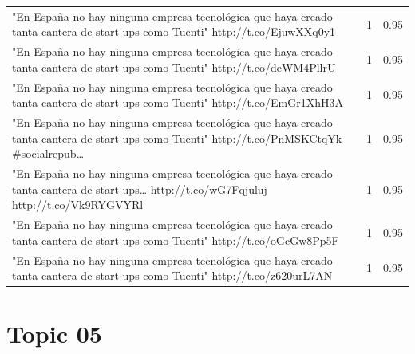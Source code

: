 \begin{longtable}{p{12.5cm}rr}
"En España no hay ninguna empresa tecnológica que haya creado tanta cantera de start-ups como Tuenti" http://t.co/EjuwXXq0y1 & 1 & 0.95 \\
"En España no hay ninguna empresa tecnológica que haya creado tanta cantera de start-ups como Tuenti" http://t.co/deWM4PllrU & 1 & 0.95 \\
"En España no hay ninguna empresa tecnológica que haya creado tanta cantera de start-ups como Tuenti" http://t.co/EmGr1XhH3A & 1 & 0.95 \\
"En España no hay ninguna empresa tecnológica que haya creado tanta cantera de start-ups como Tuenti" http://t.co/PnMSKCtqYk \#socialrepub… & 1 & 0.95 \\
"En España no hay ninguna empresa tecnológica que haya creado tanta cantera de start-ups… http://t.co/wG7Fqjuluj http://t.co/Vk9RYGVYRl & 1 & 0.95 \\
"En España no hay ninguna empresa tecnológica que haya creado tanta cantera de start-ups como Tuenti" http://t.co/oGcGw8Pp5F & 1 & 0.95 \\
"En España no hay ninguna empresa tecnológica que haya creado tanta cantera de start-ups como Tuenti" http://t.co/z620urL7AN & 1 & 0.95 \\

\end{longtable}
\clearpage

\section{Topic 05}

